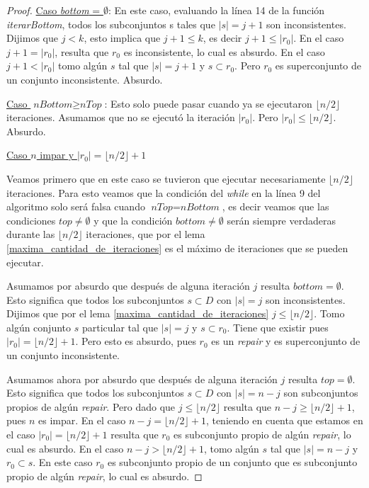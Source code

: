 \documentclass[11pt,a4paper,twoside]{tesis}
\newcommand{\parteEntera}{\lfloor n/2 \rfloor}
\begin{document}
\begin{proof}
\underline{Caso \textit{bottom} = $\emptyset$}: En este caso, evaluando la línea 14 de la función \textit{iterarBottom}, todos los subconjuntos s tales que $|s| = j + 1$ son inconsistentes. Dijimos que $j<k$, esto implica que $j + 1 \leq k$, es decir $j + 1 \leq |r_0|$. En el caso $j + 1 = |r_0|$, resulta que $r_0$ es inconsistente, lo cual es absurdo. En el caso  $j + 1 < |r_0|$ tomo algún $s$ tal que $|s| = j + 1$ y $s \subset r_0$. Pero $r_0$ es superconjunto de un conjunto inconsistente. Absurdo.

\underline{Caso $\textit{nBottom} \geq \textit{nTop}$}: Esto solo puede pasar cuando ya se ejecutaron $\parteEntera$ iteraciones. Asumamos que no se ejecutó la iteración $|r_0|$. Pero $|r_0| \leq \parteEntera$. Absurdo.

\begin{center}
\underline{Caso $n$ impar y $|r_0| = \parteEntera + 1$}
 \end{center}

 Veamos primero que en este caso se tuvieron que ejecutar necesariamente $\parteEntera$ iteraciones. Para esto veamos que la condición del \textit{while} en la línea 9 del algoritmo solo será falsa cuando $\textit{nTop} = \textit{nBottom}$, es decir veamos que las condiciones $\textit{top} \neq \emptyset$ y que la condición $\textit{bottom} \neq \emptyset$ serán siempre verdaderas durante las $\parteEntera$ iteraciones, que por el lema \ref{maxima_cantidad_de_iteraciones} es el máximo de iteraciones que se pueden ejecutar. 

Asumamos por absurdo que después de alguna iteración $j$ resulta $\textit{bottom} = \emptyset$. Esto significa que todos los subconjuntos $s \subset D$ con $|s| = j$ son inconsistentes. Dijimos que por el lema \ref{maxima_cantidad_de_iteraciones} $j \leq \parteEntera$. Tomo algún conjunto $s$ particular tal que $|s| = j$ y $s \subset r_0$. Tiene que existir pues $|r_0| = \parteEntera + 1$. Pero esto es absurdo, pues $r_0$ es un  \textit{repair} y es superconjunto de un conjunto inconsistente. 

Asumamos ahora por absurdo que después de alguna iteración $j$ resulta $\textit{top} = \emptyset$. Esto significa que todos los subconjuntos $s \subset D$ con $|s| = n - j$ son subconjuntos propios de algún \textit{repair}. Pero dado que $j \leq \parteEntera$ resulta que $ n - j \geq \parteEntera + 1$, pues $n$ es impar. En el caso $n - j = \parteEntera + 1$, teniendo en cuenta que estamos en el caso $|r_0| = \parteEntera + 1$ resulta que $r_0$ es subconjunto propio de algún \textit{repair}, lo cual es absurdo. En el caso $ n - j > \parteEntera + 1$, tomo algún $s$ tal que $|s| = n - j$ y $r_0 \subset s$. En este caso $r_0$ es subconjunto propio de un conjunto que es subconjunto propio de algún \textit{repair}, lo cual es absurdo.


\end{proof}
\end{document}
